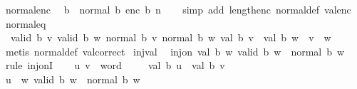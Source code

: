 \begin{isabellebody}
\ normal{\isacharunderscore}{\kern0pt}enc{\isacharcolon}{\kern0pt}\isanewline
\ \ {\isachardoublequoteopen}{}{\isasymle}b\ {\isasymLongrightarrow}\ normal\ b\ {\isacharparenleft}{\kern0pt}enc\ b\ n{\isacharparenright}{\kern0pt}{\isachardoublequoteclose}\isanewline
%
\isadelimproof
\ \ %
\endisadelimproof
%
\isatagproof
{}\isamarkupfalse%
\ {\isacharparenleft}{\kern0pt}simp\ add{\isacharcolon}{\kern0pt}\ length{\isacharunderscore}{\kern0pt}enc\ normal{\isacharunderscore}{\kern0pt}def\ val{\isacharunderscore}{\kern0pt}enc{\isacharparenright}{\kern0pt}%
\endisatagproof
{\isafoldproof}%
%
\isadelimproof
\isanewline
%
\endisadelimproof
\isanewline
{}\isamarkupfalse%
\ normal{\isacharunderscore}{\kern0pt}eq{\isacharcolon}{\kern0pt}\isanewline
\ \ {\isachardoublequoteopen}{\isasymlbrakk}valid\ b\ v{\isacharsemicolon}{\kern0pt}\ valid\ b\ w{\isacharsemicolon}{\kern0pt}\ normal\ b\ v{\isacharsemicolon}{\kern0pt}\ normal\ b\ w{\isacharsemicolon}{\kern0pt}\ val\ b\ v\ {\isacharequal}{\kern0pt}\ val\ b\ w{\isasymrbrakk}\ {\isasymLongrightarrow}\ v\ {\isacharequal}{\kern0pt}\ w{\isachardoublequoteclose}\isanewline
%
\isadelimproof
\ \ %
\endisadelimproof
%
\isatagproof
{}\isamarkupfalse%
\ {\isacharparenleft}{\kern0pt}metis\ normal{\isacharunderscore}{\kern0pt}def\ val{\isacharunderscore}{\kern0pt}correct{\isacharparenright}{\kern0pt}%
\endisatagproof
{\isafoldproof}%
%
\isadelimproof
\isanewline
%
\endisadelimproof
\isanewline
{}\isamarkupfalse%
\ inj{\isacharunderscore}{\kern0pt}val{\isacharcolon}{\kern0pt}\isanewline
\ \ {\isachardoublequoteopen}inj{\isacharunderscore}{\kern0pt}on\ {\isacharparenleft}{\kern0pt}val\ b{\isacharparenright}{\kern0pt}\ {\isacharbraceleft}{\kern0pt}w{\isachardot}{\kern0pt}\ valid\ b\ w\ {\isasymand}\ normal\ b\ w{\isacharbraceright}{\kern0pt}{\isachardoublequoteclose}\isanewline
%
\isadelimproof
%
\endisadelimproof
%
\isatagproof
{}\isamarkupfalse%
\ {\isacharparenleft}{\kern0pt}rule\ inj{\isacharunderscore}{\kern0pt}onI{\isacharparenright}{\kern0pt}\isanewline
\ \ \isamarkupfalse%
\ u\ v\ {\isacharcolon}{\kern0pt}{\isacharcolon}{\kern0pt}\ word\isanewline
\ \ \isamarkupfalse%
\ {}{\isacharcolon}{\kern0pt}\ {\isachardoublequoteopen}val\ b\ u\ {\isacharequal}{\kern0pt}\ val\ b\ v{\isachardoublequoteclose}\isanewline
\ \ \isamarkupfalse%
\ {\isachardoublequoteopen}u\ {\isasymin}\ {\isacharbraceleft}{\kern0pt}w{\isachardot}{\kern0pt}\ valid\ b\ w\ {\isasymand}\ normal\ b\ w{\isacharbraceright}{\kern0pt}{\isachardoublequoteclose}\isanewline

\end{isabellebody}
